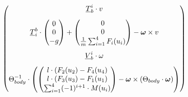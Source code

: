 \begin{align*}
\begin{pmatrix}
	\underline{T}_b^i \cdot v 
	\\[0.8em]
	\underline{T}_i^b \cdot \begin{pmatrix}0\\0\\-g	\end{pmatrix} + \begin{pmatrix}0\\0\\ \frac{1}{m}\sum_{i=1}^4 F_i(u_{i})	\end{pmatrix} - \boldsymbol{\omega} \times v 
	\\[2em]
	\underline{V}_b^i \cdot \omega
	\\[0.8em]
	\Theta_{body}^{-1} \cdot \left( \begin{pmatrix} l \cdot \left(F_2(u_{2}) - F_4(u_{4} \right)  \\ l \cdot \left(F_3(u_{3}) - F_1(u_{1} \right)  \\ \sum_{i=1}^4 (-1)^{i+1} \cdot M(u_{i}) \end{pmatrix} - \boldsymbol{\omega} \times \left( \Theta_{body} \cdot \boldsymbol{\omega} \right) \right)
	\end{pmatrix}
\end{align*}
\clearpage


